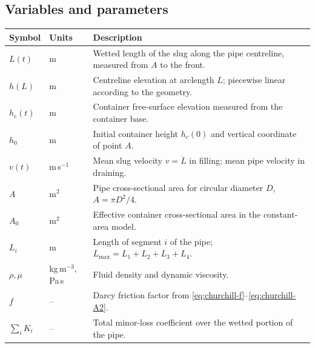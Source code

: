 \documentclass[11pt]{article}
\begin{document}
\subsection*{Variables and parameters}
\renewcommand{\arraystretch}{1.3}
\small
\begin{tabular}{lp{}p{}}
  Symbol & Units & Description \\ \hline
  $L(t)$ & m & Wetted length of the slug along the pipe centreline, measured from $A$ to the front. \\[0.2em]
  $h(L)$ & m & Centreline elevation at arclength $L$; piecewise linear according to the geometry. \\[0.2em]
  $h_c(t)$ & m & Container free-surface elevation measured from the container base. \\[0.2em]
  $h_0$ & m & Initial container height $h_c(0)$ and vertical coordinate of point $A$. \\[0.2em]
  $v(t)$ & m\,s$^{-1}$ & Mean slug velocity $v=\dot L$ in filling; mean pipe velocity in draining. \\[0.2em]
  $A$ & m$^2$ & Pipe cross-sectional area for circular diameter $D$, $A=\pi D^2/4$. \\[0.2em]
  $A_0$ & m$^2$ & Effective container cross-sectional area in the constant-area model. \\[0.2em]
  $L_i$ & m & Length of segment $i$ of the pipe; $L_{\max}=L_1+L_2+L_3+L_4$. \\[0.2em]
  $\rho,\mu$ & kg\,m$^{-3}$, Pa\,s & Fluid density and dynamic viscosity. \\[0.2em]
  $f$ & -- & Darcy friction factor from \eqref{eq:churchill-f}--\eqref{eq:churchill-A2}. \\[0.2em]
  $\sum_i K_i$ & -- & Total minor-loss coefficient over the wetted portion of the pipe. \\
\end{tabular}
\normalsize
\end{document}
